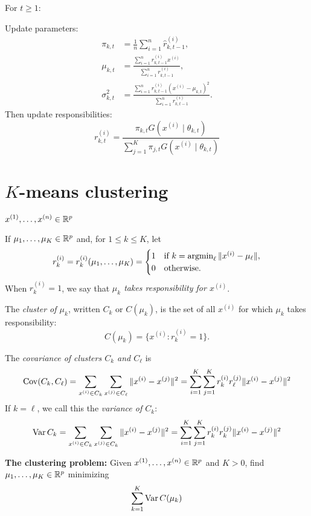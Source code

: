 \documentclass[12pt]{amsart}
\begin{document}
For $t\geq 1$:

Update parameters:
\begin{align*}
    \pi_{k, t} &= \frac1n\sum_{i=1}^n \hat r_{k,t-1}^{(i)},\\
    \mu_{k, t} &= \frac{\sum_{i=1}^n r^{(i)}_{k, t-1} x^{(i)}}{\sum_{i=1}^n r^{(i)}_{k,t-1}},\\
    \sigma_{k, t}^2 &= \frac{\sum_{i=1}^n r^{(i)}_{k, t-1}(x^{(i)}-\mu_{k,t})^2}{\sum_{i=1}^n r^{(i)}_{k, t-1}}.
\end{align*}
Then update responsibilities:
\[
    r_{k,t}^{(i)} = \frac{\pi_{k,t} G(x^{(i)} \mid \theta_{k, t})}{\sum_{j=1}^K \pi_{j,t} G(x^{(i)}\mid\theta_{k, t})}
\]


\section{$K$-means clustering}

$x^{(1)},\ldots,x^{(n)}\in\mathbb{R}^p$

If $\mu_1,\ldots,\mu_K\in\mathbb{R}^p$ and, for $1\leq k\leq K$, let
\[
r_k^{(i)} = r_k^{(i)}(\mu_1,\ldots,\mu_K) = \begin{cases}
    1&\text{if $k = \operatorname{\mathop{\operatorname*{argmin}}}_\ell \|x^{(i)} - \mu_\ell\|$},\\
    0&\text{otherwise.}
\end{cases}
\]
When $r_k^{(i)}=1$, we say that \emph{$\mu_k$ takes responsibility for $x^{(i)}$}.

The \emph{cluster of $\mu_k$}, written $C_k$ or $C(\mu_k)$,
is the set of all $x^{(i)}$ for which $\mu_k$ takes responsibility:
\[
    C(\mu_k) = \{x^{(i)} : r_k^{(i)}=1\}.
\]

The \emph{covariance of clusters $C_k$ and $C_\ell$} is
\[
    \operatorname{Cov}(C_k, C_\ell) = \sum_{x^{(i)}\in C_k}\sum_{x^{(j)}\in C_\ell}\|x^{(i)} - x^{(j)}\|^2
    = \sum_{i=1}^K\sum_{j=1}^Kr_k^{(i)}r_\ell^{(j)}\|x^{(i)} - x^{(j)}\|^2
\]
If $k=\ell$, we call this the \emph{variance of $C_k$}:
\[
    \operatorname{Var} C_k = \sum_{x^{(i)}\in C_k}\sum_{x^{(j)}\in C_k}\|x^{(i)} - x^{(j)}\|^2
    = \sum_{i=1}^K\sum_{j=1}^Kr_k^{(i)}r_k^{(j)}\|x^{(i)} - x^{(j)}\|^2
\]

\textbf{The clustering problem:} Given $x^{(1)},\ldots,x^{(n)}\in\mathbb{R}^p$ and $K>0$,
find $\mu_1,\ldots,\mu_K\in\mathbb{R}^p$ minimizing
\[
    \sum_{k=1}^K \operatorname{Var} C(\mu_k)
\]
\end{document}
